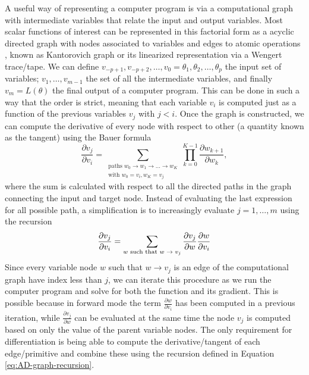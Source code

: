 A useful way of representing a computer program is via a computational graph with intermediate variables that relate the input and output variables. 
Most scalar functions of interest can be represented in this factorial form as a acyclic directed graph with nodes associated to variables and edges to atomic operations \cite{Griewank:2008kh, Griewank_1989}, known as Kantorovich graph \cite{kantorovich1957mathematical} or its linearized representation via a Wengert trace/tape\cite{Wengert_1964, Bauer_1974, Griewank:2008kh}. 
We can define $v_{-p+1}, v_{-p+2}, \ldots, v_0 = \theta_1, \theta_2, \ldots, \theta_p$ the input set of variables; $v_{1}, \ldots, v_{m-1}$ the set of all the intermediate variables, and finally $v_m = L(\theta)$ the final output of a computer program. 
This can be done in such a way that the order is strict, meaning that each variable $v_i$ is computed just as a function of the previous variables $v_j$ with $j < i$. 
Once the graph is constructed, we can compute the derivative of every node with respect to other (a quantity known as the tangent) using the Bauer formula \cite{Bauer_1974, Oktay_randomized-AD}
\begin{equation}
    \frac{\partial v_j}{\partial v_i}
    = 
    \sum_{\substack{ \text{paths }w_0 \rightarrow w_1 \rightarrow \ldots \rightarrow w_K \\
                    \text{with } w_0=v_i, w_K = v_j}}
    \prod_{k=0}^{K-1} \frac{\partial w_{k+1}}{\partial w_{k}},
\end{equation}
where the sum is calculated with respect to all the directed paths in the graph connecting the input and target node.
Instead of evaluating the last expression for all possible path, a simplification is to increasingly evaluate $j=1, \ldots, m$ using the recursion 
\begin{equation}
    \frac{\partial v_j}{\partial v_i}
    = 
    \sum_\text{$w$\text{ such that} $w \rightarrow v_j$}
    \frac{\partial v_j}{\partial w}
    \frac{\partial w}{\partial v_i} 
    \label{eq:AD-graph-recursion}
\end{equation}
Since every variable node $w$ such that $w \rightarrow v_j$ is an edge of the computational graph have index less than $j$, we can iterate this procedure as we run the computer program and solve for both the function and its gradient.
This is possible because in forward mode the term $\frac{\partial w}{\partial v_i}$ has been computed in a previous iteration, while $\frac{\partial v_j}{\partial w}$ can be evaluated at the same time the node $v_j$ is computed based on only the value of the parent variable nodes. 
The only requirement for differentiation is being able to compute the derivative/tangent of each edge/primitive and combine these using the recursion defined in Equation \eqref{eq:AD-graph-recursion}.

